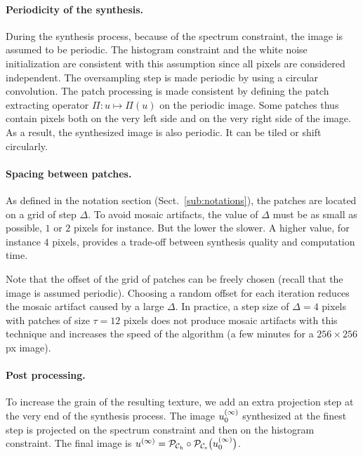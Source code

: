 \paragraph{Periodicity of the synthesis.}

During the synthesis process, because of the spectrum constraint, the image is assumed to be periodic.
The histogram constraint and the white noise initialization are consistent with this assumption since all pixels are considered independent.
The oversampling step is made periodic by using a circular convolution.
The patch processing is made consistent by defining the patch extracting operator $\Pi:u\mapsto\Pi(u)$ on the periodic image.
Some patches thus contain pixels both on the very left side and on the very right side of the image.
As a result, the synthesized image is also periodic.
It can be tiled or shift circularly.


\paragraph{Spacing between patches.}

As defined in the notation section (Sect.~\ref{sub:notations}), the patches are located on a grid of step $\Delta$.
To avoid mosaic artifacts, the value of $\Delta$ must be as small as possible, $1$ or $2$ pixels for instance.
But the lower the slower.
A higher value, for instance $4$ pixels, provides a trade-off between synthesis quality and computation time.

Note that the offset of the grid of patches can be freely chosen (recall that the image is assumed periodic).
Choosing a random offset for each iteration reduces the mosaic artifact caused by a large $\Delta$.
In practice, a step size of $\Delta=4$ pixels with patches of size $\tau=12$ pixels does not produce mosaic artifacts with this technique and increases the speed of the algorithm (a few minutes for a $256\times256$ px image).


\paragraph{Post processing.}

To increase the grain of the resulting texture, we add an extra projection step at the very end of the synthesis process.
The image $u^{(\infty)}_0$ synthesized at the finest step is projected on the spectrum constraint and then on the histogram constraint.
The final image is $u^{(\infty)} = \mathcal{P}_{\mathcal{C}_{\mathrm{h}}} \circ \mathcal{P}_{\mathcal{C}_{\mathrm{s}}} \big( u^{(\infty)}_0 \big)$.
